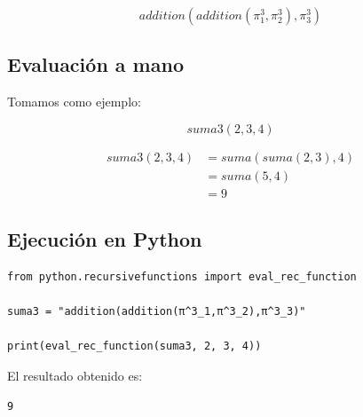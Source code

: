 \documentclass[10pt]{article}
\begin{document}
\[
    addition(addition(\pi^3_1,\pi^3_2),\pi^3_3)
\]

\subsection{Evaluación a mano}

Tomamos como ejemplo:

\[
    suma3(2,3,4)
\]

\[
\begin{aligned}
suma3(2,3,4) &= suma(suma(2,3),4) \\
              &= suma(5,4) \\
              &= 9
\end{aligned}
\]

\subsection{Ejecución en Python}

\begin{verbatim}
from python.recursivefunctions import eval_rec_function

suma3 = "addition(addition(π^3_1,π^3_2),π^3_3)"

print(eval_rec_function(suma3, 2, 3, 4))
\end{verbatim}

El resultado obtenido es:

\begin{verbatim}
9
\end{verbatim}
\end{document}
